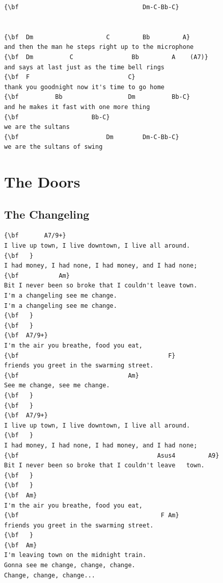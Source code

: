 \documentclass[a4paper]{article}
\begin{document}
\begin{Verbatim}[commandchars=\\\{\}]
{\bf                                  Dm-C-Bb-C}


{\bf  Dm                    C         Bb         A}
and then the man he steps right up to the microphone
{\bf  Dm          C                Bb         A    (A7)}
and says at last just as the time bell rings
{\bf  F                           C}
thank you goodnight now it's time to go home
{\bf          Bb                  Dm          Bb-C}
and he makes it fast with one more thing
{\bf                    Bb-C}
we are the sultans
{\bf                        Dm        Dm-C-Bb-C}
we are the sultans of swing

\end{Verbatim}
\newpage
\section{The Doors}
\subsection{The Changeling}
\begin{Verbatim}[commandchars=\\\{\}]
{\bf       A7/9+}
I live up town, I live downtown, I live all around.
{\bf   }
I had money, I had none, I had money, and I had none;
{\bf           Am}
Bit I never been so broke that I couldn't leave town.
I'm a changeling see me change.
I'm a changeling see me change.
{\bf   }
{\bf   }
{\bf  A7/9+}
I'm the air you breathe, food you eat,
{\bf                                         F}
friends you greet in the swarming street.
{\bf                              Am}
See me change, see me change.
{\bf   }
{\bf   }
{\bf  A7/9+}
I live up town, I live downtown, I live all around.
{\bf   }
I had money, I had none, I had money, and I had none;
{\bf                                      Asus4         A9}
Bit I never been so broke that I couldn't leave   town.
{\bf   }
{\bf   }
{\bf  Am}
I'm the air you breathe, food you eat,
{\bf                                       F Am}
friends you greet in the swarming street.
{\bf   }
{\bf  Am}
I'm leaving town on the midnight train.
Gonna see me change, change, change.
Change, change, change...

\end{Verbatim}
\newpage
\end{document}
